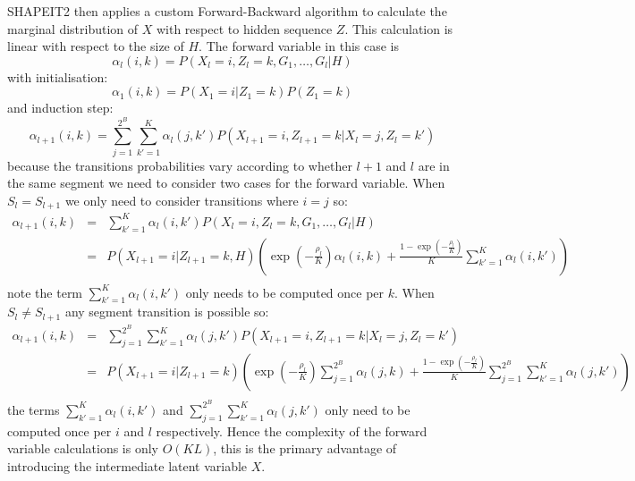 SHAPEIT2 then applies a custom Forward-Backward algorithm to calculate the marginal distribution of $X$ with respect to hidden sequence $Z$.  This calculation is linear with respect to the size of $H$.  The forward variable in this case is 
$$\alpha_l(i,k) = P(X_l=i,Z_l=k,G_1,\ldots,G_l|H)$$
with initialisation:
$$\alpha_1(i,k) = P(X_1=i|Z_1=k)P(Z_1=k)$$
and induction step:
$$\alpha_{l+1}(i,k) =  \sum_{j=1}^{2^B} \sum_{k'=1}^K \alpha_l(j,k') P(X_{l+1}=i,Z_{l+1}=k|X_l=j,Z_l=k')$$
because the transitions probabilities vary according to whether $l+1$ and $l$ are in the same segment we need to consider two cases for the forward variable. When $S_l=S_{l+1}$  we only need to consider transitions where $i=j$ so:
\begin{eqnarray*}
  \alpha_{l+1}(i,k) &=& \sum_{k'=1}^K   \alpha_l(i,k') P(X_l=i,Z_l=k,G_1,\ldots,G_l|H)\\
  &=& P(X_{l+1}=i|Z_{l+1}=k,H) \left(\exp(-\frac{\rho_l}{K})\alpha_l(i,k) + \frac{1-\exp(-\frac{\rho_l}{K})}{K}\sum_{k'=1}^K \alpha_l(i,k')  \right)\\
\end{eqnarray*}note the term $\sum_{k'=1}^K \alpha_l(i,k')$ only needs to be computed once per $k$. When $S_l\neq S_{l+1}$  any segment transition is possible so:
\begin{eqnarray*}
\alpha_{l+1}(i,k) &=&  \sum_{j=1}^{2^B} \sum_{k'=1}^K \alpha_l(j,k') P(X_{l+1}=i,Z_{l+1}=k|X_l=j,Z_l=k')\\
&=& P(X_{l+1}=i|Z_{l+1}=k)\left(\exp(-\frac{\rho_l}{K}) \sum_{j=1}^{2^B} \alpha_l(j,k) + \frac{1-\exp(-\frac{\rho_l}{K})}{K} \sum_{j=1}^{2^B} \sum_{k'=1}^K \alpha_l(j,k') \right)\\
\end{eqnarray*}the terms $\sum_{k'=1}^{K} \alpha_l(i,k')$ and $\sum_{j=1}^{2^B} \sum_{k'=1}^K \alpha_l(j,k')$ only need to be computed once per $i$ and $l$ respectively. Hence the complexity of the forward variable calculations is only $O(KL)$, this is the primary advantage of introducing the intermediate latent variable $X$.  

